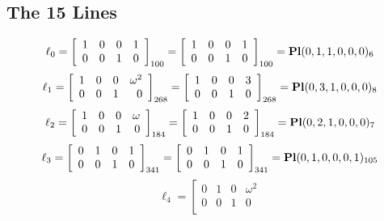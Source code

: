 \documentclass{article}
\begin{document}
{\subsection*{The 15 Lines}
$$
\ell_{0} = 
\left[
\begin{array}{*{4}{r}}
1 & 0 & 0 & 1\\
0 & 0 & 1 & 0\\
\end{array}
\right]
_{100}
=
\left[
\begin{array}{*{4}c}
1  & 0  & 0  & 1\\
0  & 0  & 1  & 0\\
\end{array}
\right]_{100}
={\rm\bf Pl}(0,1,1,0,0,0 )_{6}$$
$$
\ell_{1} = 
\left[
\begin{array}{*{4}{r}}
1 & 0 & 0 & \omega^{2}\\
0 & 0 & 1 & 0\\
\end{array}
\right]
_{268}
=
\left[
\begin{array}{*{4}c}
1  & 0  & 0  & 3\\
0  & 0  & 1  & 0\\
\end{array}
\right]_{268}
={\rm\bf Pl}(0,3,1,0,0,0 )_{8}$$
$$
\ell_{2} = 
\left[
\begin{array}{*{4}{r}}
1 & 0 & 0 & \omega \\
0 & 0 & 1 & 0\\
\end{array}
\right]
_{184}
=
\left[
\begin{array}{*{4}c}
1  & 0  & 0  & 2\\
0  & 0  & 1  & 0\\
\end{array}
\right]_{184}
={\rm\bf Pl}(0,2,1,0,0,0 )_{7}$$
$$
\ell_{3} = 
\left[
\begin{array}{*{4}{r}}
0 & 1 & 0 & 1\\
0 & 0 & 1 & 0\\
\end{array}
\right]
_{341}
=
\left[
\begin{array}{*{4}c}
0  & 1  & 0  & 1\\
0  & 0  & 1  & 0\\
\end{array}
\right]_{341}
={\rm\bf Pl}(0,1,0,0,0,1 )_{105}$$
$$
\ell_{4} = 
\left[
\begin{array}{*{4}{r}}
0 & 1 & 0 & \omega^{2}\\
0 & 0 & 1 & 0\\

\end{array}$$}
\end{document}
